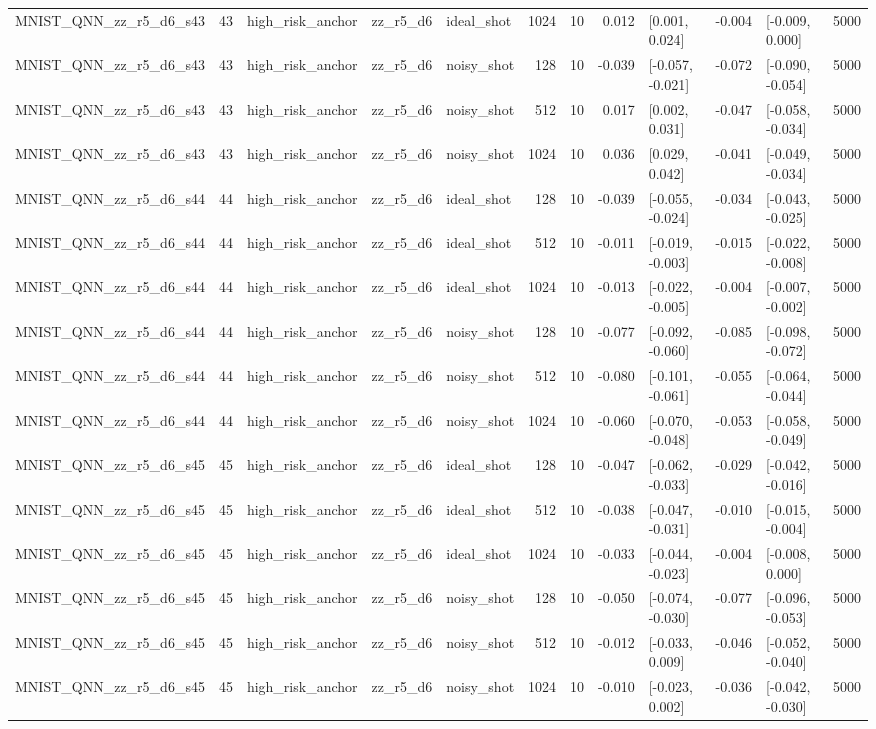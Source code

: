 \begin{table}[t]
\begin{tabular}{lrlllrrrlrlr}
MNIST\_QNN\_zz\_r5\_d6\_s43 & 43 & high\_risk\_anchor & zz\_r5\_d6 & ideal\_shot & 1024 & 10 & 0.012 & [0.001, 0.024] & -0.004 & [-0.009, 0.000] & 5000 \\
MNIST\_QNN\_zz\_r5\_d6\_s43 & 43 & high\_risk\_anchor & zz\_r5\_d6 & noisy\_shot & 128 & 10 & -0.039 & [-0.057, -0.021] & -0.072 & [-0.090, -0.054] & 5000 \\
MNIST\_QNN\_zz\_r5\_d6\_s43 & 43 & high\_risk\_anchor & zz\_r5\_d6 & noisy\_shot & 512 & 10 & 0.017 & [0.002, 0.031] & -0.047 & [-0.058, -0.034] & 5000 \\
MNIST\_QNN\_zz\_r5\_d6\_s43 & 43 & high\_risk\_anchor & zz\_r5\_d6 & noisy\_shot & 1024 & 10 & 0.036 & [0.029, 0.042] & -0.041 & [-0.049, -0.034] & 5000 \\
MNIST\_QNN\_zz\_r5\_d6\_s44 & 44 & high\_risk\_anchor & zz\_r5\_d6 & ideal\_shot & 128 & 10 & -0.039 & [-0.055, -0.024] & -0.034 & [-0.043, -0.025] & 5000 \\
MNIST\_QNN\_zz\_r5\_d6\_s44 & 44 & high\_risk\_anchor & zz\_r5\_d6 & ideal\_shot & 512 & 10 & -0.011 & [-0.019, -0.003] & -0.015 & [-0.022, -0.008] & 5000 \\
MNIST\_QNN\_zz\_r5\_d6\_s44 & 44 & high\_risk\_anchor & zz\_r5\_d6 & ideal\_shot & 1024 & 10 & -0.013 & [-0.022, -0.005] & -0.004 & [-0.007, -0.002] & 5000 \\
MNIST\_QNN\_zz\_r5\_d6\_s44 & 44 & high\_risk\_anchor & zz\_r5\_d6 & noisy\_shot & 128 & 10 & -0.077 & [-0.092, -0.060] & -0.085 & [-0.098, -0.072] & 5000 \\
MNIST\_QNN\_zz\_r5\_d6\_s44 & 44 & high\_risk\_anchor & zz\_r5\_d6 & noisy\_shot & 512 & 10 & -0.080 & [-0.101, -0.061] & -0.055 & [-0.064, -0.044] & 5000 \\
MNIST\_QNN\_zz\_r5\_d6\_s44 & 44 & high\_risk\_anchor & zz\_r5\_d6 & noisy\_shot & 1024 & 10 & -0.060 & [-0.070, -0.048] & -0.053 & [-0.058, -0.049] & 5000 \\
MNIST\_QNN\_zz\_r5\_d6\_s45 & 45 & high\_risk\_anchor & zz\_r5\_d6 & ideal\_shot & 128 & 10 & -0.047 & [-0.062, -0.033] & -0.029 & [-0.042, -0.016] & 5000 \\
MNIST\_QNN\_zz\_r5\_d6\_s45 & 45 & high\_risk\_anchor & zz\_r5\_d6 & ideal\_shot & 512 & 10 & -0.038 & [-0.047, -0.031] & -0.010 & [-0.015, -0.004] & 5000 \\
MNIST\_QNN\_zz\_r5\_d6\_s45 & 45 & high\_risk\_anchor & zz\_r5\_d6 & ideal\_shot & 1024 & 10 & -0.033 & [-0.044, -0.023] & -0.004 & [-0.008, 0.000] & 5000 \\
MNIST\_QNN\_zz\_r5\_d6\_s45 & 45 & high\_risk\_anchor & zz\_r5\_d6 & noisy\_shot & 128 & 10 & -0.050 & [-0.074, -0.030] & -0.077 & [-0.096, -0.053] & 5000 \\
MNIST\_QNN\_zz\_r5\_d6\_s45 & 45 & high\_risk\_anchor & zz\_r5\_d6 & noisy\_shot & 512 & 10 & -0.012 & [-0.033, 0.009] & -0.046 & [-0.052, -0.040] & 5000 \\
MNIST\_QNN\_zz\_r5\_d6\_s45 & 45 & high\_risk\_anchor & zz\_r5\_d6 & noisy\_shot & 1024 & 10 & -0.010 & [-0.023, 0.002] & -0.036 & [-0.042, -0.030] & 5000 \\
\bottomrule
\end{tabular}
\end{table}
